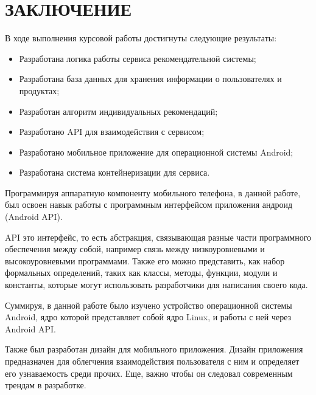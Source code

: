 \chapter*{ЗАКЛЮЧЕНИЕ}
В ходе выполнения курсовой работы достигнуты следующие результаты:

\begin{itemize}
	\item Разработана логика работы сервиса рекомендательной системы;
	\item Разработана база данных для хранения информации о пользователях и
		продуктах;
	\item Разработан алгоритм индивидуальных рекомендаций;
	\item Разработано API для взаимодействия с сервисом;
	\item Разработано мобильное приложение для операционной системы
		Android;
	\item Разработана система контейнеризации для сервиса.
\end{itemize}

Программируя аппаратную компоненту мобильного телефона, в данной
работе, был освоен навык работы с программным интерфейсом приложения
андроид (Android API).\par
API это интерфейс, то есть абстракция, связывающая разные части
программного обеспечения между собой, например связь между
низкоуровневыми и высокоуровневыми программами.
Также его можно представить, как набор формальных определений, таких как классы, методы,
функции, модули и константы, которые могут использовать разработчики для
написания своего кода.\par
Суммируя, в данной работе было изучено устройство операционной
системы Android, ядро которой представляет собой ядро Linux, и работы с ней
через Android API.\par
Также был разработан дизайн для мобильного приложения.
Дизайн приложения предназначен для облегчения взаимодействия пользователя с ним
и определяет его узнаваемость среди прочих.
Еще, важно чтобы он следовал современным трендам в разработке.

